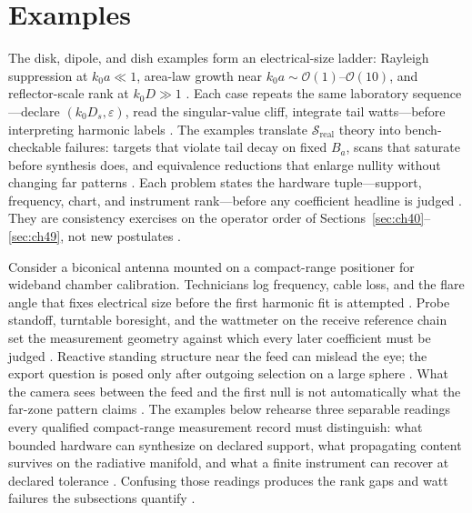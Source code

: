 \section{Examples}
\label{sec:ch410}
The disk, dipole, and dish examples form an electrical-size ladder: Rayleigh suppression at $k_0a\ll1$, area-law growth near $k_0a\sim\mathcal{O}(1)$--$\mathcal{O}(10)$, and reflector-scale rank at $k_0D\gg1$ \cite{chu1948,jackson1999}. Each case repeats the same laboratory sequence---declare $(k_0 D_s,\varepsilon)$, read the singular-value cliff, integrate tail watts---before interpreting harmonic labels \cite{hansen1988}.
The examples translate $\mathcal{S}_{\mathrm{real}}$ theory into bench-checkable failures: targets that violate tail decay on fixed $B_a$, scans that saturate before synthesis does, and equivalence reductions that enlarge nullity without changing far patterns \cite{hansen1988}. Each problem states the hardware tuple---support, frequency, chart, and instrument rank---before any coefficient headline is judged \cite{stratton1941}. They are consistency exercises on the operator order of Sections~\ref{sec:ch40}--\ref{sec:ch49}, not new postulates \cite{harrington2001}.
\begin{physicalvignette}
Consider a biconical antenna mounted on a compact-range positioner for wideband chamber calibration. Technicians log frequency, cable loss, and the flare angle that fixes electrical size before the first harmonic fit is attempted \cite{hansen1988}. Probe standoff, turntable boresight, and the wattmeter on the receive reference chain set the measurement geometry against which every later coefficient must be judged \cite{harrington2001}.
Reactive standing structure near the feed can mislead the eye; the export question is posed only after outgoing selection on a large sphere \cite{jackson1999}. What the camera sees between the feed and the first null is not automatically what the far-zone pattern claims \cite{harrington2001}.
The examples below rehearse three separable readings every qualified compact-range measurement record must distinguish: what bounded hardware can synthesize on declared support, what propagating content survives on the radiative manifold, and what a finite instrument can recover at declared tolerance \cite{devaney2004}. Confusing those readings produces the rank gaps and watt failures the subsections quantify \cite{hansen1988}.
\end{physicalvignette}
